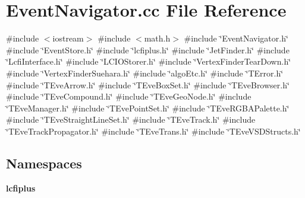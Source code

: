\section{Event\+Navigator.\+cc File Reference}
\label{EventNavigator_8cc}
{\ttfamily \#include $<$iostream$>$}\newline
{\ttfamily \#include $<$math.\+h$>$}\newline
{\ttfamily \#include \char`\"{}Event\+Navigator.\+h\char`\"{}}\newline
{\ttfamily \#include \char`\"{}Event\+Store.\+h\char`\"{}}\newline
{\ttfamily \#include \char`\"{}lcfiplus.\+h\char`\"{}}\newline
{\ttfamily \#include \char`\"{}Jet\+Finder.\+h\char`\"{}}\newline
{\ttfamily \#include \char`\"{}Lcfi\+Interface.\+h\char`\"{}}\newline
{\ttfamily \#include \char`\"{}L\+C\+I\+O\+Storer.\+h\char`\"{}}\newline
{\ttfamily \#include \char`\"{}Vertex\+Finder\+Tear\+Down.\+h\char`\"{}}\newline
{\ttfamily \#include \char`\"{}Vertex\+Finder\+Suehara.\+h\char`\"{}}\newline
{\ttfamily \#include \char`\"{}algo\+Etc.\+h\char`\"{}}\newline
{\ttfamily \#include \char`\"{}T\+Error.\+h\char`\"{}}\newline
{\ttfamily \#include \char`\"{}T\+Eve\+Arrow.\+h\char`\"{}}\newline
{\ttfamily \#include \char`\"{}T\+Eve\+Box\+Set.\+h\char`\"{}}\newline
{\ttfamily \#include \char`\"{}T\+Eve\+Browser.\+h\char`\"{}}\newline
{\ttfamily \#include \char`\"{}T\+Eve\+Compound.\+h\char`\"{}}\newline
{\ttfamily \#include \char`\"{}T\+Eve\+Geo\+Node.\+h\char`\"{}}\newline
{\ttfamily \#include \char`\"{}T\+Eve\+Manager.\+h\char`\"{}}\newline
{\ttfamily \#include \char`\"{}T\+Eve\+Point\+Set.\+h\char`\"{}}\newline
{\ttfamily \#include \char`\"{}T\+Eve\+R\+G\+B\+A\+Palette.\+h\char`\"{}}\newline
{\ttfamily \#include \char`\"{}T\+Eve\+Straight\+Line\+Set.\+h\char`\"{}}\newline
{\ttfamily \#include \char`\"{}T\+Eve\+Track.\+h\char`\"{}}\newline
{\ttfamily \#include \char`\"{}T\+Eve\+Track\+Propagator.\+h\char`\"{}}\newline
{\ttfamily \#include \char`\"{}T\+Eve\+Trans.\+h\char`\"{}}\newline
{\ttfamily \#include \char`\"{}T\+Eve\+V\+S\+D\+Structs.\+h\char`\"{}}\newline
\subsection*{Namespaces}
\begin{DoxyCompactItemize}
\item 
 \textbf{ lcfiplus}
\end{DoxyCompactItemize}
